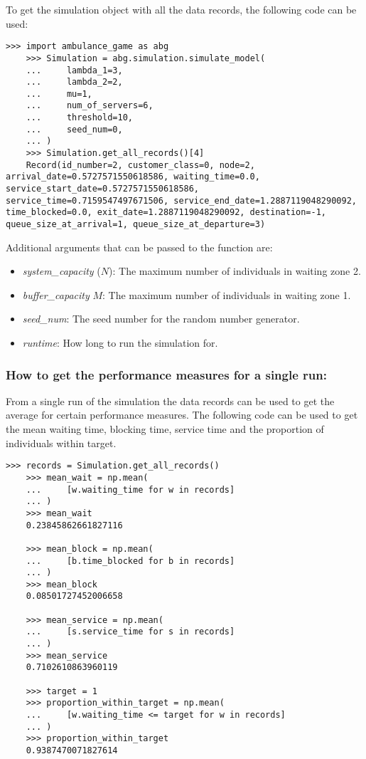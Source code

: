 To get the simulation object with all the data records, the following code can be
used:

\begin{lstlisting}[style=pystyle]
    >>> import ambulance_game as abg
    >>> Simulation = abg.simulation.simulate_model(
    ...     lambda_1=3,
    ...     lambda_2=2,
    ...     mu=1,
    ...     num_of_servers=6,
    ...     threshold=10,
    ...     seed_num=0,
    ... )
    >>> Simulation.get_all_records()[4]
    Record(id_number=2, customer_class=0, node=2, arrival_date=0.5727571550618586, waiting_time=0.0, service_start_date=0.5727571550618586, service_time=0.7159547497671506, service_end_date=1.2887119048290092, time_blocked=0.0, exit_date=1.2887119048290092, destination=-1, queue_size_at_arrival=1, queue_size_at_departure=3)

\end{lstlisting}

Additional arguments that can be passed to the function are:
\begin{itemize}
    \item \textit{system\_capacity} (\(N\)): The maximum number of individuals in 
    waiting zone 2.
    \item \textit{buffer\_capacity} \(M\): The maximum number of individuals in 
    waiting zone 1.
    \item \textit{seed\_num}: The seed number for the random number generator.
    \item \textit{runtime}: How long to run the simulation for.
\end{itemize}

\subsubsection{How to get the performance measures for a single run:}
From a single run of the simulation the data records can be used to get the
average for certain performance measures. 
The following code can be used to get the mean waiting time, blocking time, 
service time and the proportion of individuals within target.

\begin{lstlisting}[style=pystyle]
    >>> records = Simulation.get_all_records()
    >>> mean_wait = np.mean(
    ...     [w.waiting_time for w in records]
    ... )
    >>> mean_wait
    0.23845862661827116

    >>> mean_block = np.mean(
    ...     [b.time_blocked for b in records]
    ... )
    >>> mean_block
    0.08501727452006658

    >>> mean_service = np.mean(
    ...     [s.service_time for s in records]
    ... )
    >>> mean_service
    0.7102610863960119

    >>> target = 1
    >>> proportion_within_target = np.mean(
    ...     [w.waiting_time <= target for w in records]
    ... )
    >>> proportion_within_target
    0.9387470071827614
    
\end{lstlisting}


